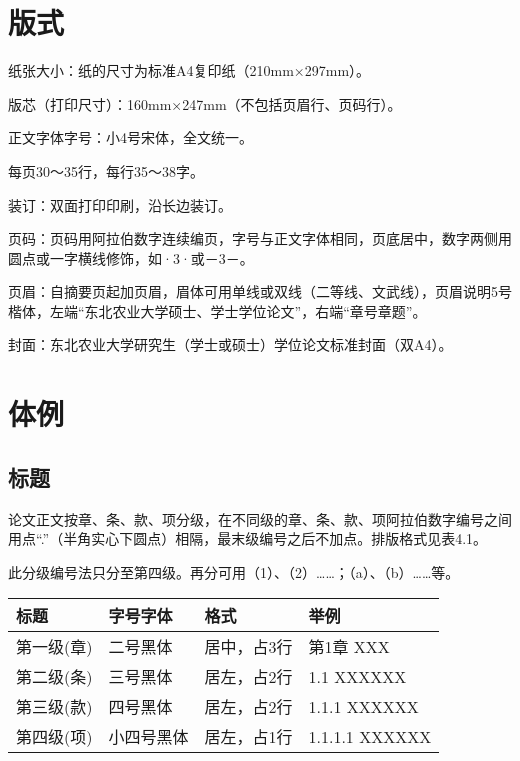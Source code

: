 \section{版式}
纸张大小：纸的尺寸为标准A4复印纸（210mm×297mm）。

版芯（打印尺寸）：160mm×247mm（不包括页眉行、页码行）。

正文字体字号：小4号宋体，全文统一。

每页30～35行，每行35～38字。

装订：双面打印印刷，沿长边装订。

页码：页码用阿拉伯数字连续编页，字号与正文字体相同，页底居中，数字两侧用圆点或一字横线修饰，如·3·或－3－。

页眉：自摘要页起加页眉，眉体可用单线或双线（二等线、文武线），页眉说明5号楷体，左端“东北农业大学硕士、学士学位论文”，右端“章号章题”。

封面：东北农业大学研究生（学士或硕士）学位论文标准封面（双A4）。

\section{体例}

\subsection{标题}

论文正文按章、条、款、项分级，在不同级的章、条、款、项阿拉伯数字编号之间用点“.”（半角实心下圆点）相隔，最末级编号之后不加点。排版格式见表4.1。

此分级编号法只分至第四级。再分可用（1）、（2）……；（a）、（b）……等。

\begin{table}[htpb]
    \begin{center}
        \begin{tabular}{|l | l | l | l |}
            \hline
            标题       & 字号字体   & 格式        & 举例           \\
            \hline
            第一级(章) & 二号黑体   & 居中，占3行 & 第1章 XXX      \\
            \hline
            第二级(条) & 三号黑体   & 居左，占2行 & 1.1 XXXXXX     \\
            \hline
            第三级(款) & 四号黑体   & 居左，占2行 & 1.1.1 XXXXXX   \\
            \hline
            第四级(项) & 小四号黑体 & 居左，占1行 & 1.1.1.1 XXXXXX \\
            \hline
        \end{tabular}
    \end{center}
\end{table}

